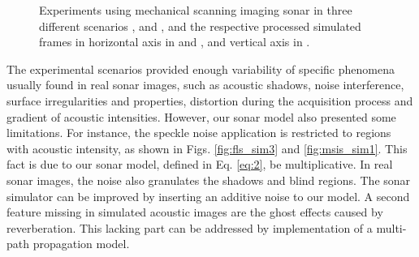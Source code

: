 \documentclass[final,5p,times]{elsarticle}
\begin{document}
\begin{figure}[!ht]
{        \label{fig:msis_sim2}
    }
    \captionsetup{justification=centering}
    \caption{Experiments using mechanical scanning imaging sonar in three
    different scenarios , 
    and , and the respective processed simulated
    frames in horizontal axis in  and
    , and vertical axis in .}
    \label{fig:msis}
\end{figure}

The experimental scenarios provided enough variability of specific phenomena
usually found in real sonar images, such as acoustic shadows, noise
interference, surface irregularities and properties, distortion during
the acquisition process and gradient of acoustic intensities. However, our
sonar model also presented some limitations. For instance, the speckle noise
application is restricted to regions with acoustic intensity, as shown in
Figs. \ref{fig:fls_sim3} and \ref{fig:msis_sim1}. This fact is due to our
sonar model, defined in Eq. \ref{eq:2}, be multiplicative. In real sonar
images, the noise also granulates the shadows and blind regions. The sonar
simulator can be improved by inserting an additive noise to our model.
A second feature missing in simulated acoustic images are the ghost effects
caused by reverberation. This lacking part can be addressed by implementation
of a multi-path propagation model.
\end{document}

